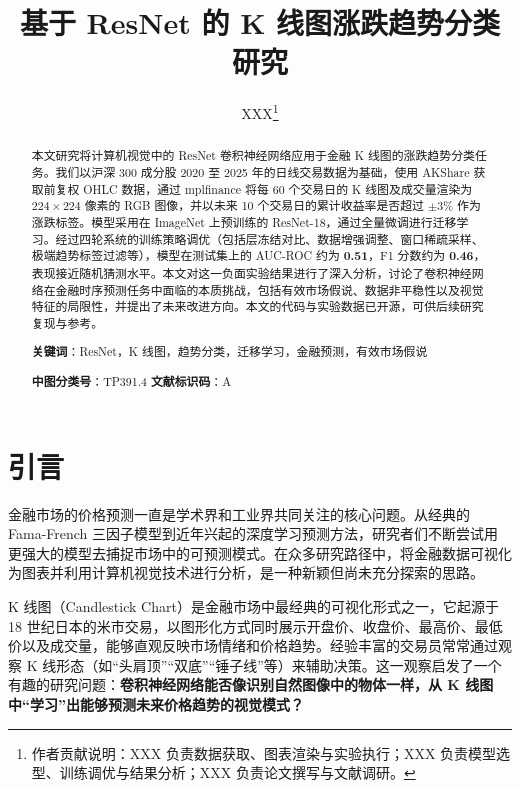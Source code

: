 \documentclass[12pt,a4paper]{ctexart}
\begin{document}
\title{\vspace{-2cm}\textbf{\Large 基于 ResNet 的 K 线图涨跌趋势分类研究}}
\author{\normalsize XXX\thanks{作者贡献说明：XXX 负责数据获取、图表渲染与实验执行；XXX 负责模型选型、训练调优与结果分析；XXX 负责论文撰写与文献调研。}}
\date{}
\maketitle

\begin{abstract}
\noindent 本文研究将计算机视觉中的 ResNet 卷积神经网络应用于金融 K 线图的涨跌趋势分类任务。我们以沪深 300 成分股 2020 至 2025 年的日线交易数据为基础，使用 AKShare 获取前复权 OHLC 数据，通过 mplfinance 将每 60 个交易日的 K 线图及成交量渲染为 $224 \times 224$ 像素的 RGB 图像，并以未来 10 个交易日的累计收益率是否超过 $\pm 3\%$ 作为涨跌标签。模型采用在 ImageNet 上预训练的 ResNet-18，通过全量微调进行迁移学习。经过四轮系统的训练策略调优（包括层冻结对比、数据增强调整、窗口稀疏采样、极端趋势标签过滤等），模型在测试集上的 AUC-ROC 约为 \textbf{0.51}，F1 分数约为 \textbf{0.46}，表现接近随机猜测水平。本文对这一负面实验结果进行了深入分析，讨论了卷积神经网络在金融时序预测任务中面临的本质挑战，包括有效市场假说、数据非平稳性以及视觉特征的局限性，并提出了未来改进方向。本文的代码与实验数据已开源，可供后续研究复现与参考。

\vspace{1em}
\noindent \textbf{关键词}：ResNet，K 线图，趋势分类，迁移学习，金融预测，有效市场假说

\vspace{1em}
\noindent \textbf{中图分类号}：TP391.4 \hspace{2em} \textbf{文献标识码}：A
\end{abstract}

\section{引言}

金融市场的价格预测一直是学术界和工业界共同关注的核心问题。从经典的 Fama-French 三因子模型到近年兴起的深度学习预测方法，研究者们不断尝试用更强大的模型去捕捉市场中的可预测模式\cite{fama1970}。在众多研究路径中，将金融数据可视化为图表并利用计算机视觉技术进行分析，是一种新颖但尚未充分探索的思路。

K 线图（Candlestick Chart）是金融市场中最经典的可视化形式之一，它起源于 18 世纪日本的米市交易，以图形化方式同时展示开盘价、收盘价、最高价、最低价以及成交量，能够直观反映市场情绪和价格趋势。经验丰富的交易员常常通过观察 K 线形态（如``头肩顶''``双底''``锤子线''等）来辅助决策。这一观察启发了一个有趣的研究问题：\textbf{卷积神经网络能否像识别自然图像中的物体一样，从 K 线图中``学习''出能够预测未来价格趋势的视觉模式？}
\end{document}
